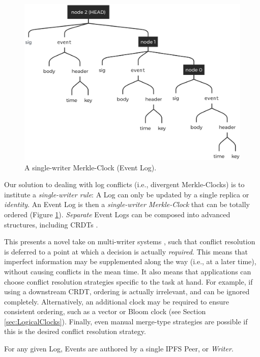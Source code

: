 \documentclass{textile}
\begin{document}
\begin{figure}[!t]
  \includegraphics[width=\linewidth]{figures/Event_Log.png}
  \caption{A single-writer Merkle-Clock (Event Log).}
  \label{fig:EventLog}
\end{figure}

Our solution to dealing with log conflicts (i.e., divergent Merkle-Clocks) is to institute a \emph{single-writer rule}: A Log can only be updated by a single replica or \emph{identity}. An Event Log is then a \emph{single-writer Merkle-Clock} that can be totally ordered (Figure \ref{fig:EventLog}). \emph{Separate} Event Logs can be composed into advanced structures, including CRDTs \cite{enesSingleWriterPrincipleCRDT2017}.

This presents a novel take on multi-writer systems \cite{enesSingleWriterPrincipleCRDT2017}, such that conflict resolution is deferred to a point at which a decision is actually \emph{required}. This means that imperfect information may be supplemented along the way (i.e., at a later time), without causing conflicts in the mean time. It also means that applications can choose conflict resolution strategies specific to the task at hand. For example, if using a downstream CRDT, ordering is actually irrelevant, and can be ignored completely. Alternatively, an additional clock may be required to ensure consistent ordering, such as a vector or Bloom clock (see Section \ref{sec:LogicalClocks}). Finally, even manual merge-type strategies are possible if this is the desired conflict resolution strategy.

For any given Log, Events are authored by a single IPFS Peer, or \emph{Writer}.
\end{document}
